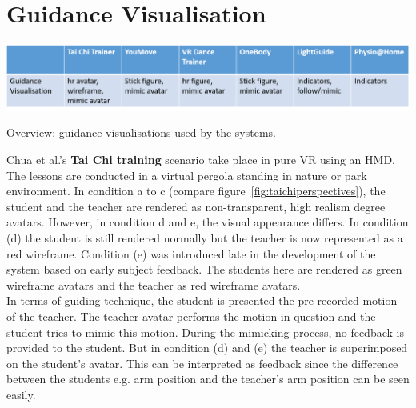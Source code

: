 \section{Guidance Visualisation}
\begin{table}[h!]
	\centering
	\includegraphics[width=1.0\textwidth]{img/tbl3.png}
	\caption{Overview: guidance visualisations used by the systems.}
	\label{fig:tbl3}
\end{table}
Chua et al.'s \textbf{Tai Chi training} scenario take place in pure VR using an HMD. The lessons are conducted in a virtual pergola standing in nature or park environment. In condition a to c (compare figure~\ref{fig:taichiperspectives}), the student and the teacher are rendered as non-transparent, high realism degree avatars. However, in condition d and e, the visual appearance differs. In condition (d) the student is still rendered normally but the teacher is now represented as a red wireframe. Condition (e) was introduced late in the development of the system based on early subject feedback. The students here are rendered as green wireframe avatars and the teacher as red wireframe avatars.\\
In terms of guiding technique, the student is presented the pre-recorded motion of the teacher. The teacher avatar performs the motion in question and the student tries to mimic this motion. During the mimicking process, no feedback is provided to the student. But in condition (d) and (e) the teacher is superimposed on the student's avatar. This can be interpreted as feedback since the difference between the students e.g. arm position and the teacher's arm position can be seen easily.\\ \\
